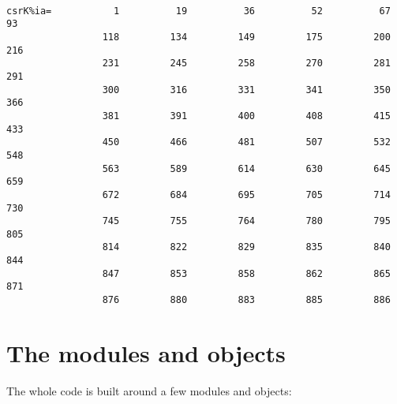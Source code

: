 \begin{small}
\begin{verbatim}
            
csrK%ia=           1          19          36          52          67          93
                 118         134         149         175         200         216
                 231         245         258         270         281         291
                 300         316         331         341         350         366
                 381         391         400         408         415         433
                 450         466         481         507         532         548
                 563         589         614         630         645         659
                 672         684         695         705         714         730
                 745         755         764         780         795         805
                 814         822         829         835         840         844
                 847         853         858         862         865         871
                 876         880         883         885         886
\end{verbatim}
\end{small}



































\newpage
\section{The modules and objects}
The whole code is built around a few modules and objects:


